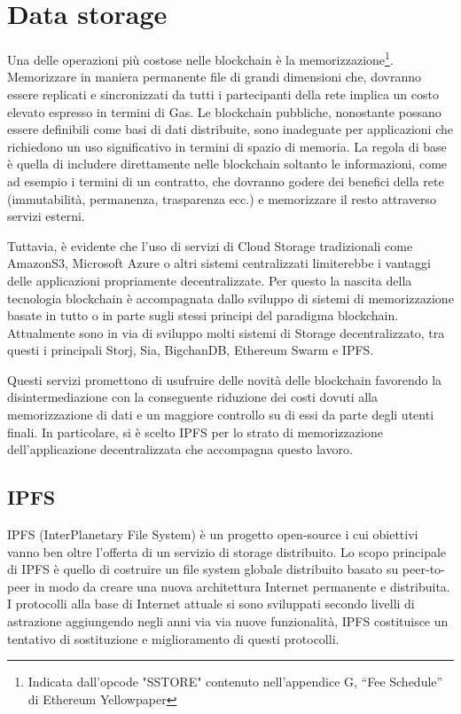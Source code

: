 \section{Data storage}

Una delle operazioni più costose nelle blockchain è la memorizzazione\footnote{Indicata dall'opcode "SSTORE" contenuto nell'appendice G, “Fee Schedule” di Ethereum Yellowpaper}. Memorizzare in maniera permanente file di grandi dimensioni che, dovranno essere replicati e sincronizzati da tutti i partecipanti della rete implica un costo elevato espresso in termini di Gas. Le blockchain pubbliche, nonostante possano essere definibili come basi di dati distribuite, sono inadeguate per applicazioni che richiedono un uso significativo in termini di spazio di memoria. La regola di base è quella di includere direttamente nelle blockchain soltanto le informazioni, come ad esempio i termini di un contratto, che dovranno godere dei benefici della rete (immutabilità, permanenza, trasparenza ecc.) e memorizzare il resto attraverso servizi esterni.

Tuttavia, è evidente che l'uso di servizi di Cloud Storage tradizionali come AmazonS3, Microsoft Azure o altri sistemi centralizzati limiterebbe i vantaggi delle applicazioni propriamente decentralizzate. Per questo la nascita della tecnologia blockchain è accompagnata dallo sviluppo di sistemi di memorizzazione basate in tutto o in parte sugli stessi principi del paradigma blockchain. Attualmente sono in via di sviluppo molti sistemi di Storage decentralizzato, tra questi i principali Storj, Sia, BigchanDB, Ethereum Swarm e IPFS.

Questi servizi promettono di usufruire delle novità delle blockchain favorendo la disintermediazione con la conseguente riduzione dei costi dovuti alla memorizzazione di dati e un maggiore controllo su di essi da parte degli utenti finali. In particolare, si è scelto IPFS per lo strato di memorizzazione dell'applicazione decentralizzata che accompagna questo lavoro.

\subsection{IPFS}

IPFS (InterPlanetary File System) è un progetto open-source i cui obiettivi vanno ben oltre l'offerta di un servizio di storage distribuito. Lo scopo principale di IPFS è quello di costruire un file system globale distribuito basato su peer-to-peer in modo da creare una nuova architettura Internet permanente e distribuita. I protocolli alla base di Internet attuale si sono sviluppati secondo livelli di astrazione aggiungendo negli anni via via nuove funzionalità, IPFS costituisce un tentativo di sostituzione e miglioramento di questi protocolli. 

